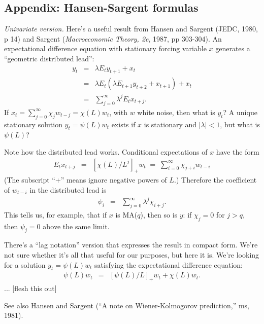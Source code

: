 \documentclass[11pt]{article}
\begin{document}
\pagebreak
\subsection*{Appendix:  Hansen-Sargent formulas}

{\it Univariate version.\/}  
Here's a useful result from Hansen and Sargent (JEDC, 1980, p 14) 
and Sargent ({\it Macroeconomic Theory, 2e\/}, 1987, pp 303-304).  
An expectational difference equation with stationary forcing 
variable $x$ generates a 
``geometric distributed lead'':    
\begin{eqnarray*}
    y_t &=&    \lambda E_t y_{t+1} + x_t  \\
        &=&  \lambda E_t (\lambda  E_{t+1} y_{t+2} + x_{t+1}) +  x_t \\
        &=&  \sum_{j=0}^\infty \lambda^j  E_t x_{t+j} .
\end{eqnarray*}
If $ x_t = \sum_{j=0}^\infty \chi_j w_{t-j} = \chi(L) w_t $,  
with $w$ white noise, then what is $y_t$?  
A unique stationary solution $ y_t = \psi(L) w_t $
exists if $x$ is stationary and $ |\lambda|<1 $, 
but what is $\psi(L)$? 


Note how the distributed lead works.  
Conditional expectations of $x$ have the form 
\begin{eqnarray*}
    E_t x_{t+j}  &=&  [\chi(L)/L^j]_+ w_t 
                 \;=\;  \sum_{i=0}^\infty \chi_{j+i} w_{t-i} 
\end{eqnarray*}
(The subscript ``+'' means ignore negative powers of $L$.) 
Therefore the coefficient of $ w_{t-i}$ in the distributed lead is 
\begin{eqnarray*}
    \psi_i &=& \sum_{j=0}^\infty \lambda^j \chi_{i+j} .
\end{eqnarray*}
This tells us, for example, that if $x$ is MA($q$), then so is $y$:
if $ \chi_{j} = 0$ for $ j > q $, 
then $ \psi_j = 0 $ above the same limit.    

There's a ``lag notation'' version that expresses the result in 
compact form.
We're not sure whether it's all that useful for our purposes, 
but here it is.  
We're looking for a solution $y_t = \psi(L) w_t$ satisfying the 
expectational difference equation:  
\begin{eqnarray*}
    \psi(L) w_t &=& [\psi(L)/L]_+ w_t + \chi(L) w_t  .
\end{eqnarray*}
...
[flesh this out]  


See also Hansen and Sargent (``A note on Wiener-Kolmogorov prediction,''
ms, 1981).  
\end{document}
